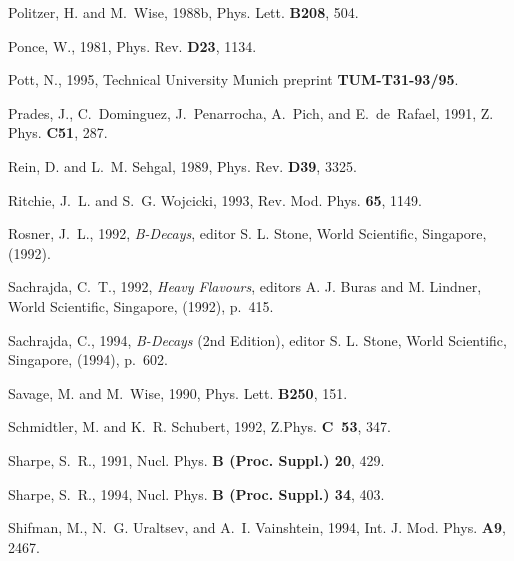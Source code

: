 \begin{thebibliography}{\protect{}1991}
Politzer, H. and M.~Wise, 1988b,
\newblock Phys. Lett. {\bf B208}, 504.

Ponce, W., 1981,
\newblock Phys. Rev. {\bf D23}, 1134.

Pott, N., 1995,
\newblock Technical University Munich preprint {\bf TUM-T31-93/95}.

Prades, J., C.~Dominguez, J.~Penarrocha, A.~Pich, and E.~de~Rafael, 1991,
\newblock Z. Phys. {\bf C51}, 287.

Rein, D. and L.~M. Sehgal, 1989,
\newblock Phys. Rev. {\bf D39}, 3325.

Ritchie, J.~L. and S.~G. Wojcicki, 1993,
\newblock Rev. Mod. Phys. {\bf 65}, 1149.

Rosner, J.~L., 1992,
 {\em B-Decays}, {\rm editor S. L. Stone, World Scientific,
  Singapore, (1992)}.

Sachrajda, C.~T., 1992,
 {\em Heavy Flavours}, {\rm editors A. J. Buras and M.
  Lindner, World Scientific, Singapore, (1992), p.\ 415}.

Sachrajda, C., 1994,
 {\em B-Decays} {\rm (2nd Edition), editor S. L. Stone, World
  Scientific, Singapore, (1994), p.\ 602}.

Savage, M. and M.~Wise, 1990,
\newblock Phys. Lett. {\bf B250}, 151.

Schmidtler, M. and K.~R. Schubert, 1992,
\newblock Z.Phys. {\bf C~53}, 347.

Sharpe, S.~R., 1991,
\newblock Nucl. Phys. {\bf B (Proc. Suppl.) 20}, 429.

Sharpe, S.~R., 1994,
\newblock Nucl. Phys. {\bf B (Proc. Suppl.) 34}, 403.

Shifman, M., N.~G. Uraltsev, and A.~I. Vainshtein, 1994,
\newblock Int. J. Mod. Phys. {\bf A9}, 2467.


\end{thebibliography}
